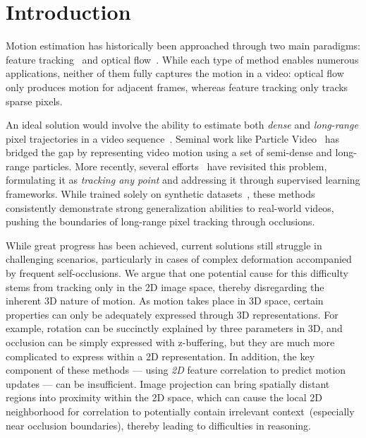 \section{Introduction}\label{sec:intro}


Motion estimation has historically been approached through two main paradigms: feature tracking~\cite{lucas1981iterative,shi1994good,tomasi1991detection,lowe2004distinctive} and optical flow~\cite{horn1981determining,teed2020raft,beauchemin1995computation}. While each type of method enables numerous applications, neither of them fully captures the motion in a video: optical flow only produces motion for adjacent frames, whereas feature tracking only tracks sparse pixels.

An ideal solution would involve the ability to estimate both \emph{dense} and \emph{long-range} pixel trajectories in a video sequence~\cite{PartVid,rubinstein2012towards}. Seminal work like Particle Video~\cite{PartVid} has bridged the gap by representing video motion using a set of semi-dense and long-range particles. More recently, several efforts~\cite{pips,tap-vid,Tapir,cotracker} have revisited this problem, formulating it as \emph{tracking any point} and addressing it through supervised learning frameworks. While trained solely on synthetic datasets~\cite{kubric,zheng2023pointodyssey}, these methods consistently demonstrate strong generalization abilities to real-world videos, pushing the boundaries of long-range pixel tracking through occlusions.

While great progress has been achieved, current solutions still struggle in challenging scenarios, particularly in cases of complex deformation accompanied by frequent self-occlusions. We argue that one potential cause for this difficulty stems from tracking only in the 2D image space, thereby disregarding the inherent 3D nature of motion. As motion takes place in 3D space, certain properties can only be adequately expressed through 3D representations. For example, rotation can be succinctly explained by three parameters in 3D, and occlusion can be simply expressed with z-buffering, but they are much more complicated to express within a 2D representation. In addition, the key component of these methods --- using \emph{2D} feature correlation to predict motion updates --- can be insufficient. Image projection
can bring spatially distant regions into proximity within the 2D space, which can cause the local 2D neighborhood for correlation to potentially contain irrelevant context~(especially near occlusion boundaries), thereby leading to difficulties in reasoning.

